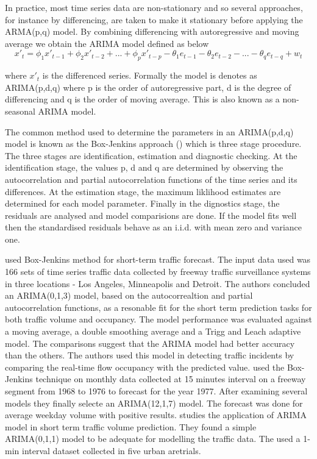 In practice, most time series data are non-stationary and so several approaches, for instance
by differencing, are taken to make it stationary before applying the ARMA(p,q) model. By
combining differencing with autoregressive and moving average we obtain the ARIMA model defined
as below
        \begin{equation} \label{eq:arima}
          x'_{t} = \phi_{1}x'_{t-1} + \phi_{2}x'_{t-2} + ... + \phi_{p}x'_{t-p} -
          \theta_{1}e_{t-1} - \theta_{2}e_{t-2} - ... - \theta_{q}e_{t-q} + w_{t}
        \end{equation}

where $x'_{t}$ is the differenced series. Formally the model is denotes as ARIMA(p,d,q) where p
is the order of autoregressive part, d is the degree of differencing and q is the order of moving
average. This is also known as a non-seasonal ARIMA model.

The common method used to determine the parameters in an ARIMA(p,d,q) model is known as the
Box-Jenkins approach (\citet{box2015time}) which is three stage procedure. The three stages are
identification, estimation and diagnostic checking. At the identification stage, the values p, d
and q are determined by observing the autocorrelation and partial autocorrelation functions of
the time series and its differences. At the estimation stage, the maximum liklihood estimates are
determined for each model parameter. Finally in the dignostics stage, the residuals are analysed
and model comparisions are done. If the model fits well then the standardised residuals behave as
an i.i.d. with mean zero and variance one.

\citet{ahmed1979analysis} used Box-Jenkins method for short-term traffic forecast. The input data
used was 166 sets of time series traffic data collected by freeway traffic surveillance systems in
three locations - Los Angeles, Minneapolis and Detroit. The authors concluded an ARIMA(0,1,3)
model, based on the autocorrealtion and partial autocorrelation functions, as a resonable fit for
the short term prediction tasks for both traffic volume and occupancy. The model performance was
evaluated against a moving average, a double smoothing average and a Trigg and Leach adaptive
model. The comparisons suggest that the ARIMA model had better accuracy than the others. The
authors used this model in detecting traffic incidents by comparing the real-time flow occupancy
with the predicted value. \citet{nihan1980use} used the Box-Jenkins technique on monthly data
collected at 15 minutes interval on a freeway segment from 1968 to 1976 to forecast for the year
1977. After examining several models they finally selecte an ARIMA(12,1,7) model. The forecast
was done for average weekday volume with positive results. \citet{hamed1995short} studies the
application of ARIMA model in short term traffic volume prediction. They found a simple ARIMA(0,1,1)
model to be adequate for modelling the traffic data. The used a 1-min interval dataset collected in
five urban aretrials.

